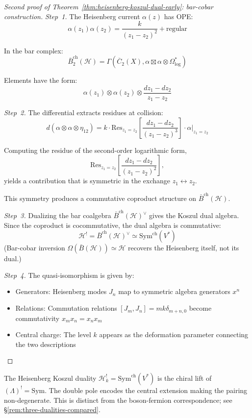 \begin{proof}[Second proof of Theorem~\textup{\ref{thm:heisenberg-koszul-dual-early}}: bar-cobar construction]
\emph{Step~1.}
The Heisenberg current $\alpha(z)$ has OPE:
\[\alpha(z_1)\alpha(z_2) = \frac{k}{(z_1-z_2)^2} + \text{regular}\]

In the bar complex:
\[\bar{B}^{\text{ch}}_2(\mathcal{H}) = \Gamma(\overline{C}_2(X), \alpha \boxtimes \alpha \otimes \Omega^*_{\log})\]

Elements have the form:
\[\alpha(z_1) \otimes \alpha(z_2) \otimes \frac{dz_1 - dz_2}{z_1-z_2}\]

\emph{Step~2.}
The differential extracts residues at collision:
\[d(\alpha \otimes \alpha \otimes \eta_{12}) = k \cdot \text{Res}_{z_1=z_2}\left[\frac{dz_1 - dz_2}{(z_1-z_2)^3}\right] \cdot \alpha|_{z_1=z_2}\]

Computing the residue of the second-order logarithmic form,
\[\text{Res}_{z_1=z_2}\left[\frac{dz_1 - dz_2}{(z_1-z_2)^2}\right],\]
yields a contribution that is symmetric in the exchange $z_1 \leftrightarrow z_2$.

This symmetry produces a commutative coproduct structure on $\bar{B}^{\text{ch}}(\mathcal{H})$.

\emph{Step~3.}
Dualizing the bar coalgebra $\bar{B}^{\mathrm{ch}}(\mathcal{H})^\vee$ gives the Koszul dual algebra.  Since the coproduct is cocommutative, the dual algebra is commutative:
\[\mathcal{H}^! = \bar{B}^{\mathrm{ch}}(\mathcal{H})^\vee \simeq \mathrm{Sym}^{\mathrm{ch}}(V^*)\]
(Bar-cobar inversion $\Omega(\bar{B}(\mathcal{H})) \simeq \mathcal{H}$ recovers the Heisenberg itself, not its dual.)

\emph{Step~4.}
The quasi-isomorphism is given by:
\begin{itemize}
\item Generators: Heisenberg modes $J_n$ map to symmetric algebra generators $x^n$
\item Relations: Commutation relations $[J_m, J_n] = mk\delta_{m+n,0}$ become commutativity $x_m x_n = x_n x_m$
\item Central charge: The level $k$ appears as the deformation parameter connecting the two descriptions
\end{itemize}
\end{proof}

\begin{remark}
The Heisenberg Koszul duality $\mathcal{H}_k^! = \mathrm{Sym}^{\mathrm{ch}}(V^*)$ is the chiral lift of $(\Lambda)^! = \mathrm{Sym}$.  The double pole encodes the central extension making the pairing non-degenerate.  This is distinct from the boson-fermion correspondence; see \S\ref{rem:three-dualities-compared}.
\end{remark}


